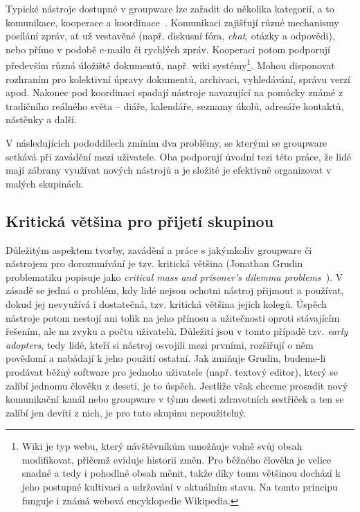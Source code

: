 \documentclass[12pt,oneside,final]{fithesis2}
\begin{document}
Typické nástroje dostupné v groupware lze zařadit do několika kategorií, a to komunikace, kooperace a koordinace~\cite{kunstova1999skupinova}. Komunikaci zajišťují různé mechanismy posílání zpráv, ať už vestavěné (např. diskusní fóra, \emph{chat}, otázky a odpovědi), nebo přímo v podobě e-mailu či rychlých zpráv. Kooperaci potom podporují především různá úložiště dokumentů, např. wiki systémy\footnote{Wiki je typ webu, který návštěvníkům umožňuje volně svůj obsah modifikovat, přičemž eviduje historii změn. Pro běžného člověka je velice snadné a tedy i pohodlné obsah měnit, takže díky tomu většinou dochází k jeho postupné kultivaci a udržování v aktuálním stavu. Na tomto principu funguje i známá webová encyklopedie Wikipedia.}. Mohou disponovat rozhraním pro kolektivní úpravy dokumentů, archivaci, vyhledávání, správu verzí apod. Nakonec pod koordinaci spadají nástroje navazující na pomůcky známé z tradičního reálného světa -- diáře, kalendáře, seznamy úkolů, adresáře kontaktů, nástěnky a další.

V následujících pododdílech zmíním dva problémy, se kterými se groupware setkává při zavádění mezi uživatele. Oba podporují úvodní tezi této práce, že lidé mají zábrany využívat nových nástrojů a je složité je efektivně organizovat v malých skupinách.

\subsection{Kritická většina pro přijetí skupinou}\label{criticalMass}
Důležitým aspektem tvorby, zavádění a práce s jakýmkoliv groupware či nástrojem pro dorozumívání je tzv. kritická většina (Jonathan Grudin problematiku popisuje jako \emph{critical mass and prisoner's dilemma problems}~\cite{grudin1994groupware}). V zásadě se jedná o problém, kdy lidé nejsou ochotni nástroj přijmout a používat, dokud jej nevyužívá i dostatečná, tzv. kritická většina jejich kolegů. Úspěch nástroje potom nestojí ani tolik na jeho přínosu a užitečnosti oproti stávajícím řešením, ale na zvyku a počtu uživatelů. Důležití jsou v tomto případě tzv. \emph{early adopters}, tedy lidé, kteří si nástroj osvojili mezi prvními, rozšiřují o něm povědomí a nabádají k jeho použití ostatní. Jak zmiňuje Grudin, budeme-li prodávat běžný software pro jednoho uživatele (např. textový editor), který se zalíbí jednomu člověku z deseti, je to úspěch. Jestliže však chceme prosadit nový komunikační kanál nebo groupware v týmu deseti zdravotních sestřiček a ten se zalíbí jen devíti z nich, je pro tuto skupinu nepoužitelný.
\end{document}
